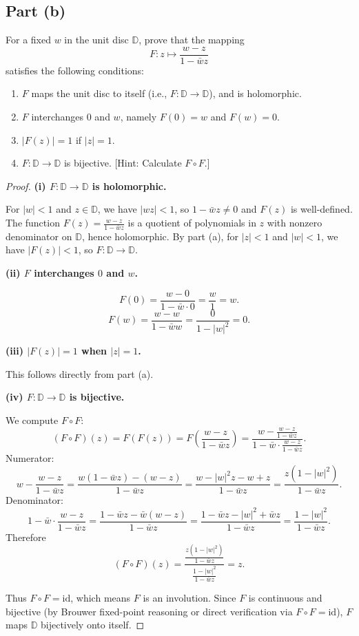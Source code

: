 \documentclass{article}
\begin{document}
\label{sec:ca-ex-2-44b}
\subsection*{Part (b)}

For a fixed $w$ in the unit disc $\mathbb{D}$, prove that the mapping
\[
  F : z \mapsto \frac{w - z}{1 - \bar wz}
\]
satisfies the following conditions:

\begin{enumerate}
  \item[(i)] $F$ maps the unit disc to itself (i.e., $F : \mathbb{D}
    \to \mathbb{D}$),
    and is holomorphic.
  \item[(ii)] $F$ interchanges $0$ and $w$, namely $F(0) = w$ and $F(w) = 0$.
  \item[(iii)] $|F(z)| = 1$ if $|z| = 1$.
  \item[(iv)] $F : \mathbb{D} \to \mathbb{D}$ is bijective. [Hint:
    Calculate $F \circ F$.]
\end{enumerate}

\begin{proof}
  \textbf{(i) $F: \mathbb{D} \to \mathbb{D}$ is holomorphic.}

  For $|w| < 1$ and $z \in \mathbb{D}$, we have $|wz| < 1$, so $1 -
  \bar wz \ne 0$
  and $F(z)$ is well-defined. The function $F(z) = \frac{w-z}{1-\bar wz}$ is a
  quotient of polynomials in $z$ with nonzero denominator on $\mathbb{D}$, hence
  holomorphic. By part (a), for $|z| < 1$ and $|w| < 1$, we have
  $|F(z)| < 1$, so $F : \mathbb{D} \to \mathbb{D}$.

  \textbf{(ii) $F$ interchanges $0$ and $w$.}

  \[
    F(0) = \frac{w - 0}{1 - \bar w \cdot 0} = \frac{w}{1} = w.
  \]
  \[
    F(w) = \frac{w - w}{1 - \bar ww} = \frac{0}{1 - |w|^2} = 0.
  \]

  \textbf{(iii) $|F(z)| = 1$ when $|z| = 1$.}

  This follows directly from part (a).

  \textbf{(iv) $F : \mathbb{D} \to \mathbb{D}$ is bijective.}

  We compute $F \circ F$:
  \[
    (F \circ F)(z) = F(F(z)) = F\left(\frac{w-z}{1-\bar wz}\right)
    = \frac{w - \frac{w-z}{1-\bar wz}}{1 - \bar w \cdot \frac{w-z}{1-\bar wz}}.
  \]
  Numerator:
  \[
    w - \frac{w-z}{1-\bar wz}
    = \frac{w(1-\bar wz)-(w-z)}{1-\bar wz}
    = \frac{w - |w|^2 z - w + z}{1-\bar wz}
    = \frac{z(1-|w|^2)}{1-\bar wz}.
  \]
  Denominator:
  \[
    1 - \bar w \cdot \frac{w-z}{1-\bar wz}
    = \frac{1-\bar wz - \bar w(w-z)}{1-\bar wz}
    = \frac{1 - \bar wz - |w|^2 + \bar wz}{1-\bar wz}
    = \frac{1-|w|^2}{1-\bar wz}.
  \]
  Therefore
  \[
    (F \circ F)(z) = \frac{\frac{z(1-|w|^2)}{1-\bar
    wz}}{\frac{1-|w|^2}{1-\bar wz}} = z.
  \]

  Thus $F \circ F = \text{id}$, which means $F$ is an involution. Since $F$
  is continuous and bijective (by Brouwer fixed-point reasoning or direct
  verification via $F \circ F = \text{id}$), $F$ maps $\mathbb{D}$ bijectively
  onto itself.
\end{proof}
\end{document}
